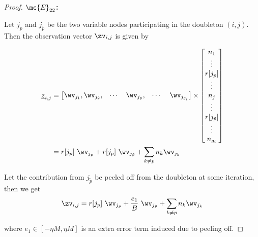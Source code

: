 \begin{proof}
	
	{\bf $\mc{E}_{22}$:}
	
	Let $j_p$ and $j_{\tilde{p}}$ be the two variable nodes participating in the doubleton $(i,j)$. Then the observation vector $\zv_{i,j}$ is given by 
	
	\begin{align*}
		\underline{z}_{i,j} &= \begin{bmatrix}
			\wv_{j_{1}},\wv_{j_2}, & \cdots   & \wv_{j_p}, &\cdots \ &\wv_{j_{g_i}}
		\end{bmatrix} \times
		\begin{bmatrix}
			n_{1} \\
			\vdots \\
			r[j_p]\\
			\vdots\\
			n_{j} \\
			\vdots\\
			r[j_{\tilde{p}}]\\
			\vdots\\
			n_{g_i}\\
		\end{bmatrix}\\
		&= r[j_p] ~ \wv_{j_p} + r[j_{\tilde{p}}] ~ \wv_{j_{\tilde{p}}} + \sum_{k \neq p}n_k \wv_{j_k} \\
	\end{align*}
	
	Let the contribution from $j_{\tilde{p}}$ be peeled off from the doubleton at some iteration, then we get
	\[ \zv_{i,j} = r[j_p] ~ \wv_{j_p} + \frac{e_1}{B} ~ \wv_{j_{\tilde{p}}} + \sum_{k \neq p}n_k \wv_{j_k}\]
	
	where $e_1 \in[-\eta M, \eta M]$ is an extra error term induced due to peeling off.
	

\end{proof}
